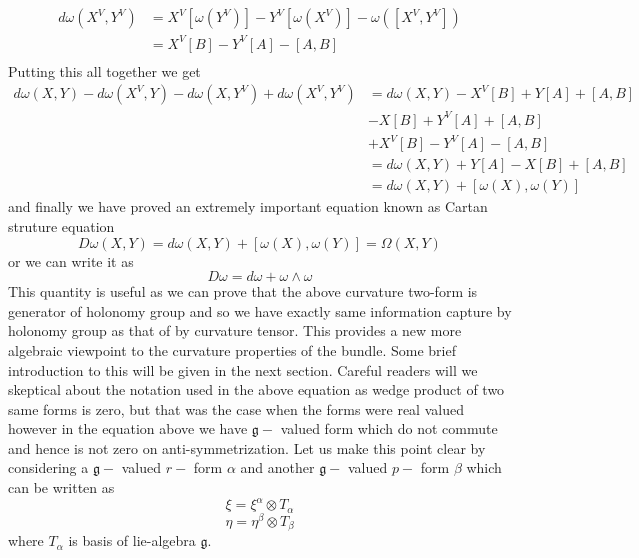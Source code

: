 \documentclass[12pt]{article}
\begin{document}
\begin{align*}
    d\omega(X^{V}, Y^{V}) &= X^{V}[\omega(Y^{V})] - Y^{V}[\omega(X^{V})] - \omega([X^{V}, Y^{V}]) \\
                          &= X^{V}[B] - Y^{V}[A] - [A, B] \\
\end{align*} Putting this all together we get
\begin{equation*}
    \begin{split}
        d\omega(X, Y) - d\omega(X^{V}, Y) - d\omega(X, Y^{V}) + d\omega(X^{V}, Y^{V}) &= d\omega(X, Y) - X^{V}[B] + Y[A] + [A, B] \\
        & - X[B] + Y^{V}[A] + [A, B] \\
        & + X^{V}[B] - Y^{V}[A] - [A, B] \\
        &= d\omega(X, Y) + Y[A] - X[B] + [A, B] \\
        &= d\omega(X, Y) + [\omega(X), \omega(Y)]
    \end{split}
\end{equation*} and finally we have proved an extremely important equation
known as Cartan struture equation
\begin{equation}\label{eq:6}
    D\omega(X, Y) = d\omega(X, Y) + [\omega(X), \omega(Y)] = \Omega(X, Y)
\end{equation} or we can write it as
\begin{equation*}
    D\omega = d\omega + \omega\wedge\omega
\end{equation*}
This quantity is useful as we can prove that the above curvature two-form is generator of holonomy group and so we have exactly same information capture by holonomy group as that of by curvature tensor. This provides a new more algebraic viewpoint to the curvature properties of the bundle. Some brief introduction to this will be given in the next section.
Careful readers will we skeptical about the notation used in the above equation as wedge product of two same forms is zero, but that was the case when the forms were real valued however in the equation above we have $\mathfrak{g}-$ valued form which do not commute and hence is not zero on anti-symmetrization. Let us make this point clear by considering a $\mathfrak{g}-$ valued $r-$ form $\alpha$ and another $\mathfrak{g}-$ valued $p-$ form $\beta$ which can be written as
\begin{equation*}
    \xi = \xi^{\alpha}\otimes T_{\alpha}
\end{equation*}
\begin{equation*}
    \eta = \eta^{\beta}\otimes T_{\beta}
\end{equation*} where $T_{\alpha}$ is basis of lie-algebra $\mathfrak{g}$.
\end{document}
